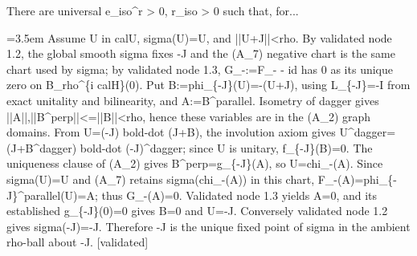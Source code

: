 \documentclass{article}
\newcommand{\step}[1]{\par\noindent\hangindent=3.5em\hangafter=1%
  \makebox[3.5em][l]{\textbf{#1.}}}
\newcommand{\steptag}[1]{\hfill{\small\textsf{[#1]}}}
\begin{document}
\begin{proofbox}{There are universal e\_iso\textasciicircum{}r > 0, r\_iso > 0 such that, for...}
\step{1.5.1} Assume U in calU, sigma(U)=U, and ||U+J||<rho. By validated node 1.2, the global smooth sigma fixes -J and the (A\_7) negative chart is the same chart used by sigma; by validated node 1.3, G\_-:=F\_- - id has 0 as its unique zero on B\_rho\textasciicircum{}\{i calH\}(0). Put B:=phi\_\{-J\}(U)=-(U+J), using L\_\{-J\}=-I from exact unitality and bilinearity, and A:=B\textasciicircum{}parallel. Isometry of dagger gives ||A||,||B\textasciicircum{}perp||<=||B||<rho, hence these variables are in the (A\_2) graph domains. From U=(-J) bold-dot (J+B), the involution axiom gives U\textasciicircum{}dagger=(J+B\textasciicircum{}dagger) bold-dot (-J)\textasciicircum{}dagger; since U is unitary, f\_\{-J\}(B)=0. The uniqueness clause of (A\_2) gives B\textasciicircum{}perp=g\_\{-J\}(A), so U=chi\_-(A). Since sigma(U)=U and (A\_7) retains sigma(chi\_-(A)) in this chart, F\_-(A)=phi\_\{-J\}\textasciicircum{}parallel(U)=A; thus G\_-(A)=0. Validated node 1.3 yields A=0, and its established g\_\{-J\}(0)=0 gives B=0 and U=-J. Conversely validated node 1.2 gives sigma(-J)=-J. Therefore -J is the unique fixed point of sigma in the ambient rho-ball about -J. \steptag{validated} \\[4pt]
\end{proofbox}
\end{document}
